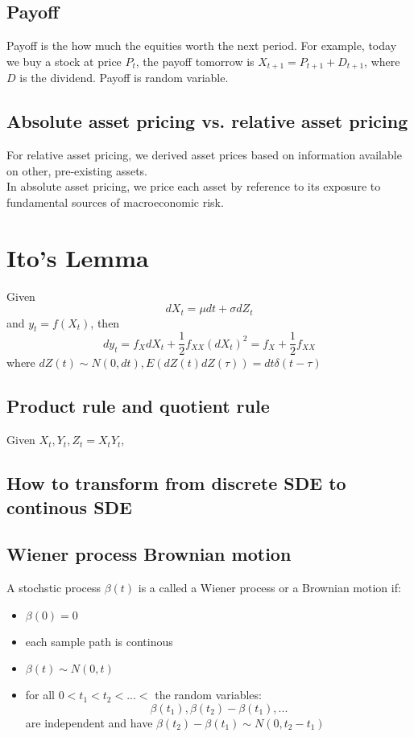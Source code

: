 \documentclass[a4paper,13pt]{report}
\begin{document}
\subsection{Payoff}
Payoff is the how much the equities worth the next period. For example, today we buy a stock at price $P_t$, the payoff tomorrow is $X_{t+1}=P_{t+1}+D_{t+1}$, where $D$ is the dividend. Payoff is random variable.  

\subsection{Absolute asset pricing vs. relative asset pricing \cite{cochrane2009asset}}
For relative asset pricing, we derived asset prices based on information available on other, pre-existing assets. \\
In absolute asset pricing, we price each asset by reference to its exposure to fundamental sources of macroeconomic risk.



\section{Ito's Lemma}
Given 
$$dX_t = \mu dt + \sigma dZ_t$$ and $y_t = f(X_t)$, then
$$dy_t = f_X dX_t + \frac{1}{2}f_{XX} (dX_t)^2 = f_X + \frac{1}{2}f_{XX}$$
where $dZ(t)\sim N(0,dt), E(dZ(t)dZ(\tau)) = dt\delta(t-\tau) $
\subsection{Product rule and quotient rule}
Given $X_t,Y_t, Z_t = X_t Y_t$,  

\subsection{How to transform from discrete SDE to continous SDE}

\subsection{Wiener process Brownian motion}
A stochstic process $\beta(t)$ is a called a Wiener process or a Brownian motion if:
\begin{itemize}
    \item $\beta(0) = 0$
    \item each sample path is continous
    \item $\beta(t)\sim N(0,t)$
    \item for all $0<t_1<t_2<...<$ the random variables:
    $$\beta(t_1),\beta(t_2)-\beta(t_1),...$$ are independent and have $\beta(t_2)-\beta(t_1) \sim N(0,t_2-t_1)$
\end{itemize}
\end{document}
